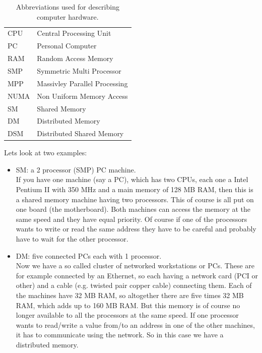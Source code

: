 \begin{table}[htbp]
  \begin{center}
    \begin{tabular}{ll}
      CPU & Central Processing Unit \\
      PC & Personal Computer \\
      RAM & Random Access Memory \\
      SMP & Symmetric Multi Processor \\
      MPP & Massivley Parallel Processing \\
      NUMA & Non Uniform Memory Access \\ 
      SM & Shared Memory \\
      DM & Distributed Memory\\
      DSM & Distributed Shared Memory \\      
    \end{tabular}
    \caption{Abbreviations used for describing computer hardware.}
    \label{tab:HarwareAbbrevs}
  \end{center}
\end{table}
Lets look at two examples:  
\begin{itemize}
\item SM: a 2 processor (SMP) PC machine.\\
If you have one machine (say a PC), which has two CPUs, each one a
Intel Pentium II with 350 MHz and a main memory of 128 MB RAM, then
this is a shared memory machine having two processors. This of course
is all put on one board (the motherboard). Both machines
can access the memory at the same speed and they have equal priority.
Of course if one of the processors wants to write or read the same
address they have to be careful and probably have to wait for the other
processor.
\item DM: five connected PCs each with 1 processor.\\
Now we have a so called cluster of networked workstations or PCs.
These are for example connected by an Ethernet, so each having a 
network card (PCI or other) and a cable (e.g. twisted pair copper cable)
connecting them. Each of the machines have 32 MB RAM, so altogether
there are five times 32 MB RAM, which adds up to 160 MB RAM. But this
memory is of course no longer available to all the processors at the
same speed. If one processor wants to read/write a value from/to an address
in one of the other machines, it has to communicate using the network.
So in this case we have a distributed memory.
\end{itemize}

